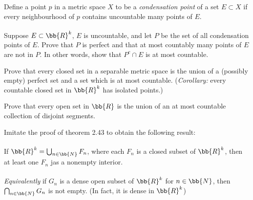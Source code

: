 \documentclass[12pt,letterpaper]{hmcpset}
\begin{document}
\begin{problem}[27.]
	Define a point $p$ in a metric space $X$ to be a \textit{condensation point} of a set $E \subset X$ if every neighbourhood of $p$ contains uncountable many points of $E$. \\\\
	Suppose $E \subset \bb{R}^k$, $E$ is uncountable, and let $P$ be the set of all condensation points of $E$. Prove that $P$ is perfect and that at most countably many points of $E$ are not in $P$. In other words, show that $P^c \cap E$ is at most countable.
\end{problem}

\begin{problem}[28.]
	Prove that every closed set in a separable metric space is the union of a (possibly empty) perfect set and a set which is at most countable. (\textit{Corollary:} every countable closed set in $\bb{R}^k$ has isolated points.)
\end{problem}

\begin{problem}[29.]
	Prove that every open set in $\bb{R}$ is the union of an at most countable collection of disjoint segments.
\end{problem}

\begin{problem}[30.]
	Imitate the proof of theorem 2.43 to obtain the following result:\\\\
	If $\bb{R}^k = \bigcup_{n \in \bb{N}} F_n$, where each $F_n$ is a closed subset of $\bb{R}^k$, then at least one $F_n$ jas a nonempty interior.\\\\
	\textit{Equivalently} if $G_n$ is a dense open subset of $\bb{R}^k$ for $n \in \bb{N}$, then $\bigcap_{n \in \bb{N}} G_n$ is not empty. (In fact, it is dense in $\bb{R}^k$)
	
\end{problem}
\end{document}
